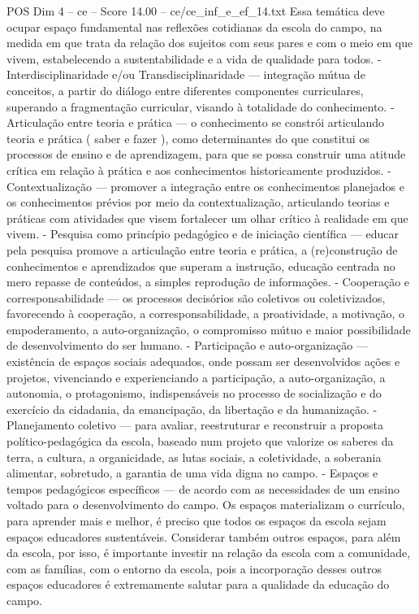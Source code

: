 \begin{textsample}{POS Dim 4 – ce – Score 14.00 – ce/ce\_inf\_e\_ef\_14.txt}
Essa temática deve ocupar espaço fundamental nas reflexões cotidianas da escola do campo, na medida em que trata da relação dos sujeitos com seus pares e com o meio em que vivem, estabelecendo a sustentabilidade e a vida de qualidade para todos. - Interdisciplinaridade e/ou Transdisciplinaridade — integração mútua de conceitos, a partir do diálogo entre diferentes componentes curriculares, superando a fragmentação curricular, visando à totalidade do conhecimento. - Articulação entre teoria e prática — o conhecimento se constrói articulando teoria e prática ( saber e fazer ), como determinantes do que constitui os processos de ensino e de aprendizagem, para que se possa construir uma atitude crítica em relação à prática e aos conhecimentos historicamente produzidos. - Contextualização — promover a integração entre os conhecimentos planejados e os conhecimentos prévios por meio da contextualização, articulando teorias e práticas com atividades que visem fortalecer um olhar crítico à realidade em que vivem. - Pesquisa como princípio pedagógico e de iniciação científica — educar pela pesquisa promove a articulação entre teoria e prática, a (re)construção de conhecimentos e aprendizados que superam a instrução, educação centrada no mero repasse de conteúdos, a simples reprodução de informações. - Cooperação e corresponsabilidade — os processos decisórios são coletivos ou coletivizados, favorecendo à cooperação, a corresponsabilidade, a proatividade, a motivação, o empoderamento, a auto-organização, o compromisso mútuo e maior possibilidade de desenvolvimento do ser humano. - Participação e auto-organização — existência de espaços sociais adequados, onde possam ser desenvolvidos ações e projetos, vivenciando e experienciando a participação, a auto-organização, a autonomia, o protagonismo, indispensáveis no processo de socialização e do exercício da cidadania, da emancipação, da libertação e da humanização. - Planejamento coletivo — para avaliar, reestruturar e reconstruir a proposta político-pedagógica da escola, baseado num projeto que valorize os saberes da terra, a cultura, a organicidade, as lutas sociais, a coletividade, a soberania alimentar, sobretudo, a garantia de uma vida digna no campo. - Espaços e tempos pedagógicos específicos — de acordo com as necessidades de um ensino voltado para o desenvolvimento do campo.
Os espaços materializam o currículo, para aprender mais e melhor, é preciso que todos os espaços da escola sejam espaços educadores sustentáveis.
Considerar também outros espaços, para além da escola, por isso, é importante investir na relação da escola com a comunidade, com as famílias, com o entorno da escola, pois a incorporação desses outros espaços educadores é extremamente salutar para a qualidade da educação do campo.

\end{textsample}
